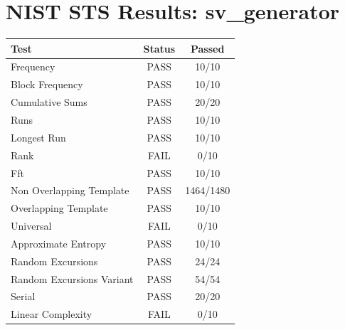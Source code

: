 \documentclass{article}
\begin{document}
\section*{NIST STS Results: sv\_generator}
\begin{tabular}{lcc}
\toprule
Test & Status & Passed \\
\midrule
Frequency & PASS & 10/10 \\
Block Frequency & PASS & 10/10 \\
Cumulative Sums & PASS & 20/20 \\
Runs & PASS & 10/10 \\
Longest Run & PASS & 10/10 \\
Rank & FAIL & 0/10 \\
Fft & PASS & 10/10 \\
Non Overlapping Template & PASS & 1464/1480 \\
Overlapping Template & PASS & 10/10 \\
Universal & FAIL & 0/10 \\
Approximate Entropy & PASS & 10/10 \\
Random Excursions & PASS & 24/24 \\
Random Excursions Variant & PASS & 54/54 \\
Serial & PASS & 20/20 \\
Linear Complexity & FAIL & 0/10 \\
\bottomrule
\end{tabular}
\end{document}
